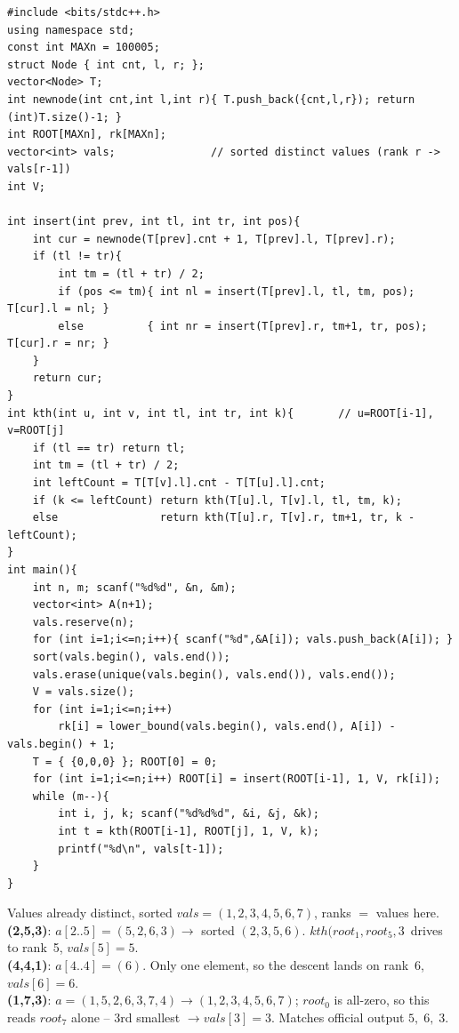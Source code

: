 \begin{lstlisting}[caption={SPOJ MKTHNUM full solution: compress, build the prefix chain, answer each query with one joint two-root descent}, label={lst:c19-mkthnum-soln}]
#include <bits/stdc++.h>
using namespace std;
const int MAXn = 100005;
struct Node { int cnt, l, r; };
vector<Node> T;
int newnode(int cnt,int l,int r){ T.push_back({cnt,l,r}); return (int)T.size()-1; }
int ROOT[MAXn], rk[MAXn];
vector<int> vals;               // sorted distinct values (rank r -> vals[r-1])
int V;

int insert(int prev, int tl, int tr, int pos){
    int cur = newnode(T[prev].cnt + 1, T[prev].l, T[prev].r);
    if (tl != tr){
        int tm = (tl + tr) / 2;
        if (pos <= tm){ int nl = insert(T[prev].l, tl, tm, pos); T[cur].l = nl; }
        else          { int nr = insert(T[prev].r, tm+1, tr, pos); T[cur].r = nr; }
    }
    return cur;
}
int kth(int u, int v, int tl, int tr, int k){       // u=ROOT[i-1], v=ROOT[j]
    if (tl == tr) return tl;
    int tm = (tl + tr) / 2;
    int leftCount = T[T[v].l].cnt - T[T[u].l].cnt;
    if (k <= leftCount) return kth(T[u].l, T[v].l, tl, tm, k);
    else                return kth(T[u].r, T[v].r, tm+1, tr, k - leftCount);
}
int main(){
    int n, m; scanf("%d%d", &n, &m);
    vector<int> A(n+1);
    vals.reserve(n);
    for (int i=1;i<=n;i++){ scanf("%d",&A[i]); vals.push_back(A[i]); }
    sort(vals.begin(), vals.end());
    vals.erase(unique(vals.begin(), vals.end()), vals.end());
    V = vals.size();
    for (int i=1;i<=n;i++)
        rk[i] = lower_bound(vals.begin(), vals.end(), A[i]) - vals.begin() + 1;
    T = { {0,0,0} }; ROOT[0] = 0;
    for (int i=1;i<=n;i++) ROOT[i] = insert(ROOT[i-1], 1, V, rk[i]);
    while (m--){
        int i, j, k; scanf("%d%d%d", &i, &j, &k);
        int t = kth(ROOT[i-1], ROOT[j], 1, V, k);
        printf("%d\n", vals[t-1]);
    }
}
\end{lstlisting}

\begin{tracebox}[MKTHNUM on a=(1,5,2,6,3,7,4): three two-root walks]
Values already distinct, sorted \(\mathit{vals}=(1,2,3,4,5,6,7)\), ranks \(=\) values here.\\
\textbf{(2,5,3)}: \(a[2..5]=(5,2,6,3)\to\) sorted \((2,3,5,6)\). \(\mathit{kth}(\mathit{root}_1,\mathit{root}_5,3\)\ drives to rank~5, \(\mathit{vals}[5]=\boxed{5}\).\\
\textbf{(4,4,1)}: \(a[4..4]=(6)\). Only one element, so the descent lands on rank~6, \(\mathit{vals}[6]=\boxed{6}\).\\
\textbf{(1,7,3)}: \(a=(1,5,2,6,3,7,4)\to(1,2,3,4,5,6,7)\); \(\mathit{root}_0\) is all-zero, so this reads \(\mathit{root}_7\) alone -- 3rd smallest \(\to\mathit{vals}[3]=\boxed{3}\).  Matches official output \(5,\;6,\;3\).
\end{tracebox}


